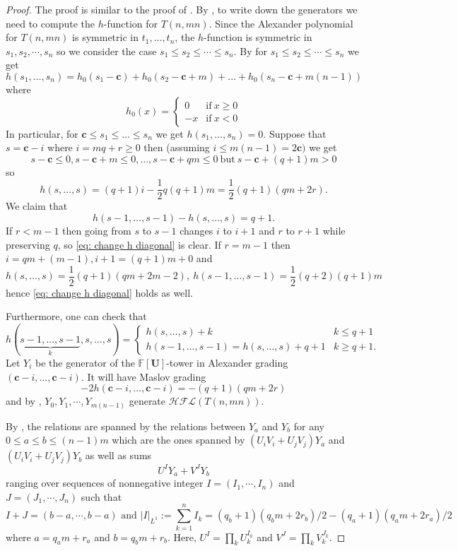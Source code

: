 \documentclass[10pt,a4paper]{amsart}
\newcommand{\F}{\mathbb{F}}
\newcommand{\cHFL}{\mathcal{H\!F\! L}}
\newcommand{\UU}{\mathbf{U}}
\newcommand{\cc}{\mathbf{c}}
\begin{document}
\begin{proof}
The proof is similar to the proof of \cite[Theorem 7.3]{BLZ}. By  \cite[Lemma 7.1]{BLZ}, to write down the generators we need to compute the $h$-function for $T(n,mn)$.  Since the Alexander polynomial for $T(n,mn)$ is symmetric in $t_1,\ldots,t_n$, the $h$-function is symmetric in $s_1,s_2,\cdots,s_n$ so we consider the case $s_1\le s_2\le\cdots \le s_n$. By \cite[Theorem 4.3]{GH} for $s_1\le s_2\le\cdots \le s_n$ we get
\begin{equation}
\label{eq: h function cable}
h(s_1,\ldots,s_n)=h_0(s_1-\cc)+h_0(s_2-\cc+m)+\ldots+h_0(s_n-\cc+m(n-1))
\end{equation}
where  
$$
h_0(x)=\begin{cases}
0 & \mathrm{if}\ x\ge 0\\
-x & \mathrm{if}\ x<0
\end{cases}
$$
In particular, for $\cc\le s_1\le \ldots\le s_n$ we get $h(s_1,\ldots,s_n)=0$. Suppose that $s=\cc-i$ where $i=mq+r\ge 0$ then (assuming $i\le m(n-1)=2\cc)$ we get
$$
s-\cc\le 0, s-\cc+m\le 0,\ldots,s-\cc+qm\le 0\ \mathrm{but}\ s-\cc+(q+1)m>0
$$
so 
$$
h(s,\ldots,s)=(q+1)i-\frac{1}{2}q(q+1)m=\frac{1}{2}(q+1)(qm+2r).
$$
We claim that 
\begin{equation}
\label{eq: change h diagonal}
h(s-1,\ldots,s-1)-h(s,\ldots,s)=q+1.
\end{equation}
 If $r<m-1$ then going from $s$ to $s-1$ changes $i$ to $i+1$ and $r$ to $r+1$ while preserving $q$, so \eqref{eq: change h diagonal} is clear. If $r=m-1$ then $i=qm+(m-1),i+1=(q+1)m+0$ and
$$
h(s,\ldots,s)=\frac{1}{2}(q+1)(qm+2m-2),\ h(s-1,\ldots,s-1)=\frac{1}{2}(q+2)(q+1)m
$$
hence \eqref{eq: change h diagonal} holds as well.

Furthermore, one can check that
$$
h(\underbrace{s-1,\ldots,s-1}_{k},s,\ldots,s)=
\begin{cases}
h(s,\ldots,s)+k & k\le q+1\\
h(s-1,\ldots,s-1)=h(s,\ldots,s)+q+1 & k\ge q+1.
\end{cases}
$$
Let $Y_i$ be the generator of the $\F[\UU]$-tower in Alexander grading $(\cc-i,\ldots,\cc-i)$. It will have Maslov grading  
\[-2h(\cc-i,\ldots,\cc-i)=-(q+1)(qm+2r)\]
and by \cite[Lemma 7.1]{BLZ}, $Y_0,Y_1,\cdots,Y_{m(n-1)}$ generate $\cHFL(T(n,mn))$.

By \cite[Lemma 7.1]{BLZ}, the relations are spanned by the relations between $Y_a$ and $Y_b$ for any $0\leq a\leq b \leq (n-1)m$ which are the ones spanned by $(U_iV_i+U_jV_j)Y_a$ and $(U_iV_i+U_jV_j)Y_b$ as well as sums
$$U^I Y_a+V^J Y_b$$
ranging over sequences of nonnegative integer $I=(I_1,\cdots,I_n)$ and $J=(J_1,\cdots,J_n)$ such that 
$$I+J=(b-a, \cdots, b-a) \text{ and } |I|_{L^1}:=\sum_{k=1}^n I_k=(q_b+1)(q_b m+2r_b)/2-(q_a+1)(q_a m+2r_a)/2$$
where $a=q_a m+r_a$ and $b=q_b m+r_b$. Here, $U^I=\prod_{k}U_k^{I_k}$ and $V^J=\prod_kV_k^{J_k}$.



\end{proof}
\end{document}

